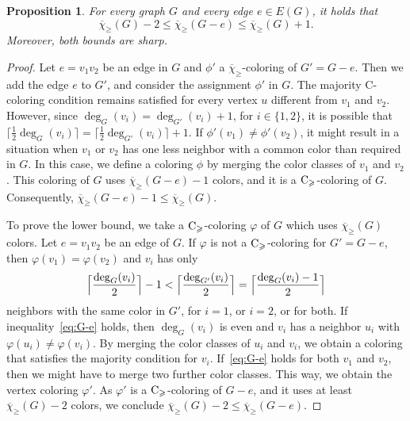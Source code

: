 \documentclass{article}
\newtheorem{proposition}[theorem]{Proposition}
\theoremstyle{definition}
\newcommand{\mc}{\overline{\chi}_{\geqslant}}
\newcommand{\cg}{{\rm C}_{\geqslant}}
\begin{document}
\begin{proposition}\label{prop:G-e}
    For every graph $G$ and every edge $e \in E(G)$, it holds that
    \begin{equation}
        \mc(G)-2 \leq \mc(G-e) \leq \mc(G) +1.\label{ineq:del_edge}
    \end{equation} 
Moreover, both bounds are sharp.
\end{proposition}

\begin{proof}
    Let $e=v_1v_2$ be an edge in $G$ and $\phi'$ a $\mc$-coloring of $G'=G-e$. Then we add the edge $e$ to $G'$, and consider the assignment $\phi'$ in $G$. The majority C-coloring condition remains satisfied for every vertex $u$ different from $v_1$ and $v_2$. However, since $\deg_G(v_i)=\deg_{G'}(v_i)+1$, for $i \in \{1,2\}$, it is possible that $\lceil\frac{1}{2}\deg_G(v_i)\rceil = \lceil\frac{1}{2} \deg_{G'}(v_i)\rceil +1$. If $\phi'(v_1) \neq \phi'(v_2)$, it might result in a situation when $v_1$ or $v_2$ has one less neighbor with a common color than required in $G$. In this case, we define a coloring $\phi$ by merging the color classes of $v_1$ and $v_2$. This coloring of $G$ uses $\mc(G-e)-1$ colors, and it is a $\cg$-coloring of $G$. Consequently, $\mc(G-e) -1 \leq \mc(G)$.

        To prove the lower bound, we take a $\cg$-coloring $\varphi$ of $G$ which uses $\mc(G)$ colors. Let $e=v_1v_2$ be an edge of $G$. If $\varphi$ is not a $\cg$-coloring for $G'=G-e$,  then $\varphi(v_1)=\varphi(v_2)$ and $v_i$ has only 
        \begin{equation} \label{eq:G-e}
           \Bigl\lceil \frac{\deg_G(v_i)}{2} \Bigr\rceil -1 < \Bigl\lceil \frac{\deg_{G'}(v_i)}{2} \Bigr\rceil= \Bigl\lceil \frac{\deg_{G}(v_i)-1}{2} \Bigr\rceil 
        \end{equation}
       neighbors with the same color in $G'$, for $i=1$, or $i=2$, or for both. If inequality~\eqref{eq:G-e} holds, then $\deg_G(v_i)$ is even and $v_i$ has a neighbor $u_i$ with $\varphi(u_i) \neq \varphi(v_i)$. By merging the color classes of $u_i$ and $v_i$, we obtain a coloring that satisfies the majority condition for $v_i$. If~\eqref{eq:G-e} holds for both $v_1$ and $v_2$, then we might have to merge two further color classes. This way, we obtain the vertex coloring $\varphi'$. As $\varphi'$ is a $\cg$-coloring of $G-e$, and it uses at least $\mc(G)-2$ colors, we conclude $\mc(G)-2 \leq \mc(G-e)$.


\end{proof}
\end{document}

